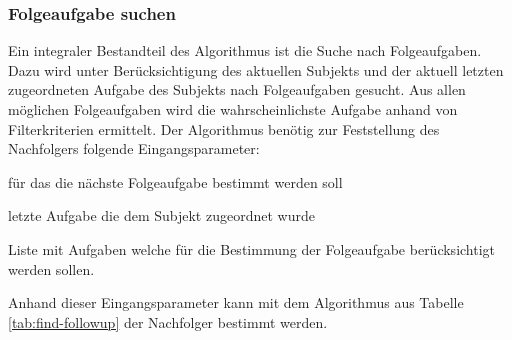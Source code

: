\subsubsection{Folgeaufgabe suchen} %
\label{ssub:folgeaufgabe_suchen}
Ein integraler Bestandteil des Algorithmus ist die Suche nach Folgeaufgaben. Dazu wird unter Berücksichtigung des aktuellen Subjekts und der aktuell letzten zugeordneten Aufgabe des Subjekts nach Folgeaufgaben gesucht. Aus allen möglichen Folgeaufgaben wird die wahrscheinlichste Aufgabe anhand von Filterkriterien ermittelt. Der Algorithmus benötig zur Feststellung des Nachfolgers folgende Eingangsparameter:

\begin{description}[align=left]
	\item [Subjekt] für das die nächste Folgeaufgabe bestimmt werden soll
	\item [Basisaufgabe] letzte Aufgabe die dem Subjekt zugeordnet wurde
	\item [mögliche Folgeaufgaben] Liste mit Aufgaben welche für die Bestimmung der Folgeaufgabe berücksichtigt werden sollen.
\end{description}

Anhand dieser Eingangsparameter kann mit dem Algorithmus aus Tabelle \ref{tab:find-followup} der Nachfolger bestimmt werden.	

